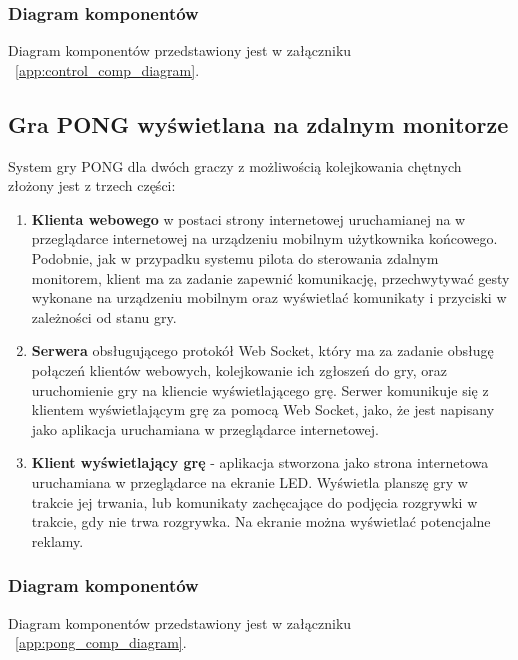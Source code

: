 \subsubsection{Diagram komponentów}

Diagram komponentów przedstawiony jest w załączniku ~\ref{app:control_comp_diagram}.

\subsection{Gra PONG wyświetlana na zdalnym monitorze}

System gry PONG dla dwóch graczy z możliwością kolejkowania chętnych złożony jest z trzech części:

\begin{enumerate}
  \item \textbf{Klienta webowego} w postaci strony internetowej uruchamianej na w przeglądarce internetowej na urządzeniu mobilnym użytkownika końcowego. Podobnie, jak w przypadku systemu pilota do sterowania zdalnym monitorem, klient ma za zadanie zapewnić komunikację, przechwytywać gesty wykonane na urządzeniu mobilnym oraz wyświetlać komunikaty i przyciski w zależności od stanu gry.
  \item \textbf{Serwera} obsługującego protokół Web Socket, który ma za zadanie obsługę połączeń klientów webowych, kolejkowanie ich zgłoszeń do gry, oraz uruchomienie gry na kliencie wyświetlającego grę. Serwer komunikuje się z klientem wyświetlającym grę za pomocą Web Socket, jako, że jest napisany jako aplikacja uruchamiana w przeglądarce internetowej.
  \item \textbf{Klient wyświetlający grę} - aplikacja stworzona jako strona internetowa uruchamiana w przeglądarce na ekranie LED. Wyświetla planszę gry w trakcie jej trwania, lub komunikaty zachęcające do podjęcia rozgrywki w trakcie, gdy nie trwa rozgrywka. Na ekranie można wyświetlać potencjalne reklamy.
\end{enumerate}

\subsubsection{Diagram komponentów}

Diagram komponentów przedstawiony jest w załączniku ~\ref{app:pong_comp_diagram}.


